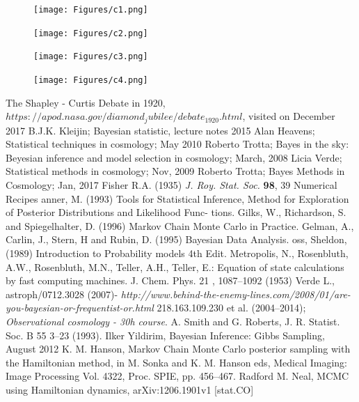 \documentclass[onecolumn,           %
               showpacs,            %
               preprintnumbers,     %
               aps,                 %
               prl,          	    %
               letterpaper,             %
               superscriptaddress,      %
               nofootinbib,         %
               tightenlines,        %
               floats,floatfix      %
               ,usenatbib,
               ]{revtex4-1}
\begin{document}
\begin{figure}[h!]
\texttt{[image: Figures/c1.png]}
\end{figure}
\begin{figure}[h!]
\texttt{[image: Figures/c2.png]}
\end{figure}
\begin{figure}[h!]
\texttt{[image: Figures/c3.png]}
\end{figure}
\begin{figure}[h!]
\texttt{[image: Figures/c4.png]}
\end{figure}

\begin{thebibliography}{9}
 The Shapley - Curtis Debate in 1920, $https://apod.nasa.gov/diamond_jubilee/debate_1920.html$, visited on December 2017
B.J.K. Kleijin; Bayesian statistic, lecture notes 2015
 Alan Heavens; Statistical techniques in cosmology; May 2010
 Roberto Trotta; Bayes in the sky: Beyesian inference and model selection in cosmology; March, 2008
 Licia Verde; Statistical methods in cosmology; Nov, 2009
Roberto Trotta; Bayes Methods in Cosmology; Jan, 2017
Fisher R.A. (1935) \textit{J. Roy. Stat. Soc.} \textbf{98}, 39
Numerical Recipes
anner, M. (1993)
Tools for Statistical Inference, Method for
Exploration of Posterior Distributions and Likelihood Func-
tions.
Gilks, W., Richardson, S. and Spiegelhalter, D. (1996)
Markov Chain
Monte Carlo in Practice.
Gelman, A., Carlin, J., Stern, H and Rubin, D. (1995)
Bayesian Data
Analysis.
oss, Sheldon, (1989)
Introduction to Probability models 4th
Edit.
 Metropolis, N., Rosenbluth, A.W., Rosenbluth, M.N., Teller, A.H., Teller, E.: Equation of state
calculations by fast computing machines. J. Chem. Phys.
21
, 1087–1092 (1953)
 Verde L., astroph/0712.3028 (2007)-
\textit{http://www.behind-the-enemy-lines.com/2008/01/are-you-bayesian-or-frequentist-or.html}
218.163.109.230 et al. (2004–2014); \textit{Observational cosmology -
30h course}.
 A. Smith and G. Roberts, J. R. Statist. Soc. B
55
3–23 (1993).
 Ilker Yildirim, Bayesian Inference: Gibbs Sampling, August 2012
K. M. Hanson, Markov Chain Monte Carlo posterior sampling with the Hamiltonian method, in M. Sonka and K. M. Hanson eds, Medical Imaging: Image Processing
Vol. 4322, Proc. SPIE, pp. 456–467.
 Radford M. Neal, MCMC using Hamiltonian dynamics, arXiv:1206.1901v1 [stat.CO]

\end{thebibliography}
\end{document}
